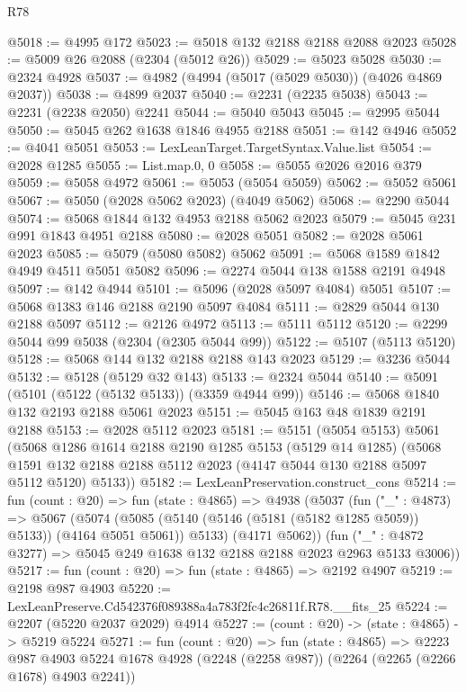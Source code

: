 \begin{lexlean}{R78}
\begin{coremodule}
@5018 := @4995 @172
@5023 := @5018 @132 @2188 @2188 @2088 @2023
@5028 := @5009 @26 @2088 (@2304 (@5012 @26))
@5029 := @5023 @5028
@5030 := @2324 @4928
@5037 := @4982 (@4994 (@5017 (@5029 @5030)) (@4026 @4869 @2037))
@5038 := @4899 @2037
@5040 := @2231 (@2235 @5038)
@5043 := @2231 (@2238 @2050) @2241
@5044 := @5040 @5043
@5045 := @2995 @5044
@5050 := @5045 @262 @1638 @1846 @4955 @2188
@5051 := @142 @4946
@5052 := @4041 @5051
@5053 := LexLeanTarget.TargetSyntax.Value.list
@5054 := @2028 @1285
@5055 := List.map.{0, 0}
@5058 := @5055 @2026 @2016 @379
@5059 := @5058 @4972
@5061 := @5053 (@5054 @5059)
@5062 := @5052 @5061
@5067 := @5050 (@2028 @5062 @2023) (@4049 @5062)
@5068 := @2290 @5044
@5074 := @5068 @1844 @132 @4953 @2188 @5062 @2023
@5079 := @5045 @231 @991 @1843 @4951 @2188
@5080 := @2028 @5051
@5082 := @2028 @5061 @2023
@5085 := @5079 (@5080 @5082) @5062
@5091 := @5068 @1589 @1842 @4949 @4511 @5051 @5082
@5096 := @2274 @5044 @138 @1588 @2191 @4948
@5097 := @142 @4944
@5101 := @5096 (@2028 @5097 @4084) @5051
@5107 := @5068 @1383 @146 @2188 @2190 @5097 @4084
@5111 := @2829 @5044 @130 @2188 @5097
@5112 := @2126 @4972
@5113 := @5111 @5112
@5120 := @2299 @5044 @99 @5038 (@2304 (@2305 @5044 @99))
@5122 := @5107 (@5113 @5120)
@5128 := @5068 @144 @132 @2188 @2188 @143 @2023
@5129 := @3236 @5044
@5132 := @5128 (@5129 @32 @143)
@5133 := @2324 @5044
@5140 := @5091 (@5101 (@5122 (@5132 @5133)) (@3359 @4944 @99))
@5146 := @5068 @1840 @132 @2193 @2188 @5061 @2023
@5151 := @5045 @163 @48 @1839 @2191 @2188
@5153 := @2028 @5112 @2023
@5181 := @5151
    (@5054 @5153)
    @5061
    (@5068
      @1286
      @1614
      @2188
      @2190
      @1285
      @5153
      (@5129 @14 @1285)
      (@5068 @1591 @132 @2188 @2188 @5112 @2023 (@4147 @5044 @130 @2188 @5097 @5112 @5120) @5133))
@5182 := LexLeanPreservation.construct_cons
@5214 := fun (count : @20) =>
  fun (state : @4865) =>
  @4938
    (@5037
      (fun ("_" : @4873) =>
      @5067
        (@5074 (@5085 (@5140 (@5146 (@5181 (@5182 @1285 @5059)) @5133)) (@4164 @5051 @5061)) @5133)
        (@4171 @5062))
      (fun ("_" : @4872 @3277) => @5045 @249 @1638 @132 @2188 @2188 @2023 @2963 @5133 @3006))
@5217 := fun (count : @20) => fun (state : @4865) => @2192 @4907
@5219 := @2198 @987 @4903
@5220 := LexLeanPreserve.Cd542376f089388a4a783f2fc4c26811f.R78.__fits_25
@5224 := @2207 (@5220 @2037 @2029) @4914
@5227 := (count : @20) -> (state : @4865) -> @5219 @5224
@5271 := fun (count : @20) =>
  fun (state : @4865) =>
  @2223
    @987
    @4903
    @5224
    @1678
    @4928
    (@2248 (@2258 @987))
    (@2264 (@2265 (@2266 @1678) @4903 @2241))

\end{coremodule}
\end{lexlean}

